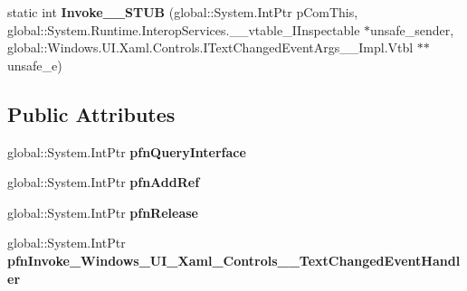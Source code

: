 \begin{DoxyCompactItemize}
\item 
\mbox{\label{struct_windows_1_1_u_i_1_1_xaml_1_1_controls_1_1_text_changed_event_handler_____impl_1_1_vtbl_a5f23308fc081d806e79e4d89b7db8027}} 
static int {\bfseries Invoke\+\_\+\+\_\+\+S\+T\+UB} (global\+::\+System.\+Int\+Ptr p\+Com\+This, global\+::\+System.\+Runtime.\+Interop\+Services.\+\_\+\+\_\+vtable\+\_\+\+I\+Inspectable $\ast$unsafe\+\_\+sender, global\+::\+Windows.\+U\+I.\+Xaml.\+Controls.\+I\+Text\+Changed\+Event\+Args\+\_\+\+\_\+\+Impl.\+Vtbl $\ast$$\ast$unsafe\+\_\+e)
\end{DoxyCompactItemize}
\subsection*{Public Attributes}
\begin{DoxyCompactItemize}
\item 
\mbox{\label{struct_windows_1_1_u_i_1_1_xaml_1_1_controls_1_1_text_changed_event_handler_____impl_1_1_vtbl_aad41340fbd8c0c7f799aa8467cd464d0}} 
global\+::\+System.\+Int\+Ptr {\bfseries pfn\+Query\+Interface}
\item 
\mbox{\label{struct_windows_1_1_u_i_1_1_xaml_1_1_controls_1_1_text_changed_event_handler_____impl_1_1_vtbl_afd1876cb8c1bed0567d25267531dccb2}} 
global\+::\+System.\+Int\+Ptr {\bfseries pfn\+Add\+Ref}
\item 
\mbox{\label{struct_windows_1_1_u_i_1_1_xaml_1_1_controls_1_1_text_changed_event_handler_____impl_1_1_vtbl_a05c157c60c17c2545fa6b3fd8b881dfd}} 
global\+::\+System.\+Int\+Ptr {\bfseries pfn\+Release}
\item 
\mbox{\label{struct_windows_1_1_u_i_1_1_xaml_1_1_controls_1_1_text_changed_event_handler_____impl_1_1_vtbl_a0d9b97a69b997ecc6b82dca501d36217}} 
global\+::\+System.\+Int\+Ptr {\bfseries pfn\+Invoke\+\_\+\+Windows\+\_\+\+U\+I\+\_\+\+Xaml\+\_\+\+Controls\+\_\+\+\_\+\+Text\+Changed\+Event\+Handler}
\end{DoxyCompactItemize}
